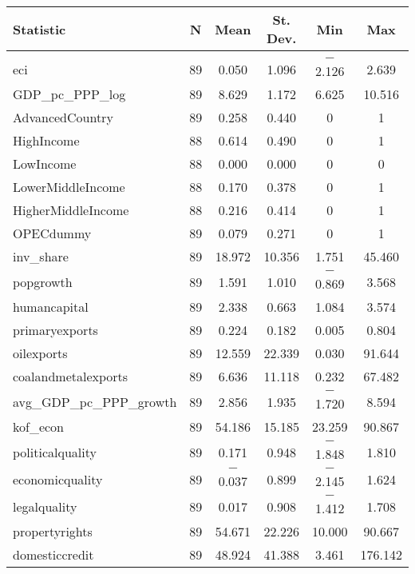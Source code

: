 
\begin{tabular}{@{\hspace{5pt}}lccccc} 
\toprule 
 
Statistic & \multicolumn{1}{c}{N} & \multicolumn{1}{c}{Mean} & \multicolumn{1}{c}{St. Dev.} & \multicolumn{1}{c}{Min} & \multicolumn{1}{c}{Max} \\ 
\midrule \\[-2.1ex] 
eci & 89 & 0.050 & 1.096 & $-$2.126 & 2.639 \\ 
GDP\_pc\_PPP\_log & 89 & 8.629 & 1.172 & 6.625 & 10.516 \\ 
AdvancedCountry & 89 & 0.258 & 0.440 & 0 & 1 \\ 
HighIncome & 88 & 0.614 & 0.490 & 0 & 1 \\ 
LowIncome & 88 & 0.000 & 0.000 & 0 & 0 \\ 
LowerMiddleIncome & 88 & 0.170 & 0.378 & 0 & 1 \\ 
HigherMiddleIncome & 88 & 0.216 & 0.414 & 0 & 1 \\ 
OPECdummy & 89 & 0.079 & 0.271 & 0 & 1 \\ 
inv\_share & 89 & 18.972 & 10.356 & 1.751 & 45.460 \\ 
popgrowth & 89 & 1.591 & 1.010 & $-$0.869 & 3.568 \\ 
humancapital & 89 & 2.338 & 0.663 & 1.084 & 3.574 \\ 
primaryexports & 89 & 0.224 & 0.182 & 0.005 & 0.804 \\ 
oilexports & 89 & 12.559 & 22.339 & 0.030 & 91.644 \\ 
coalandmetalexports & 89 & 6.636 & 11.118 & 0.232 & 67.482 \\ 
avg\_GDP\_pc\_PPP\_growth & 89 & 2.856 & 1.935 & $-$1.720 & 8.594 \\ 
kof\_econ & 89 & 54.186 & 15.185 & 23.259 & 90.867 \\ 
politicalquality & 89 & 0.171 & 0.948 & $-$1.848 & 1.810 \\ 
economicquality & 89 & $-$0.037 & 0.899 & $-$2.145 & 1.624 \\ 
legalquality & 89 & 0.017 & 0.908 & $-$1.412 & 1.708 \\ 
propertyrights & 89 & 54.671 & 22.226 & 10.000 & 90.667 \\ 
domesticcredit & 89 & 48.924 & 41.388 & 3.461 & 176.142 \\ 
\bottomrule 
\end{tabular} 
